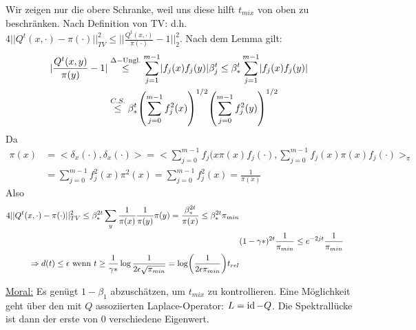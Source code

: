 \begin{beweis}
	Wir zeigen nur die obere Schranke, weil uns diese hilft $t_{mix}$ von oben zu beschränken. Nach Definition von TV:
%						
	d.h. $4 ||Q^t(x,\cdot) - \pi(\cdot )||^2_{TV} \leq ||\frac{Q^t(x,\cdot)}{\pi(\cdot)} -1||^2_2$.  Nach dem Lemma gilt:
	\begin{align}
		\abs{\frac{Q^t(x,y)}{\pi(y)} -1} &\overset{\Delta-\text{Ungl.}}{\leq} \sum\limits_{j =  1}^{m-1} \abs{f_j(x) f_j(y)} \beta^t_j \leq \beta^t_* \sum\limits_{j=1}^{m-1} \abs{f_j(x) f_j(y)} \\
			&\overset{C.S.}{\leq} \beta^t_* \enb{\sum\limits_{j = 0}^{m-1} f_j^2(x)}^{1/2} \enb{\sum\limits_{j = 0}^{m-1} f_j^2(y)}^{1/2}
	\end{align}
	Da \begin{align}
		\pi(x) &= <\delta_x(\cdot),\delta_x(\cdot)> = <\sum\limits_{j = 0}^{m-1}f_j(x \pi(x) f_j(\cdot), \sum\limits_{j = 0}^{m-1} f_j(x) \pi(x) f_j(\cdot)>_\pi \\
			&=\sum\limits_{j = 0}^{m-1} f_j^2(x)\pi^2(x) = \sum\limits_{j=0}^{m-1} f_j^2(x) = \frac{1}{\pi(x)}
	\end{align}
	Also
	\begin{align}
		4 || Q^t (x,\cdot) - \pi(\cdot) ||^2_{TV} \leq \beta^{2t}_* \sum\limits_{y}\frac{1}{\pi(x)} \frac{1}{\pi(y)} \pi(y) = \frac{\beta^{2t}_*}{\pi(x)} \leq \beta^{2t}_* \pi_{min} \\
		& (1-\gamma*)^{2t} \frac{1}{\pi_{min}} \leq e^{-2jt} \frac{1}{\pi_{min}} \\
		\Rightarrow d(t) \leq \epsilon \text{ wenn } t \geq \frac{1}{\gamma*} \log \frac{1}{2\epsilon \sqrt{\pi_{min}}} = \log \enb{\frac{1}{2\epsilon\pi_{min}}} t_{rel}
	\end{align}
\end{beweis}

\underline{Moral:} Es genügt $1-\beta_1$ abzuschätzen, um $t_{mix}$ zu kontrollieren. Eine Möglichkeit geht über den mit $Q$ assoziierten Laplace-Operator: $L = \operatorname{id} -Q$. Die Spektrallücke ist dann der erste von 0 verschiedene Eigenwert.

